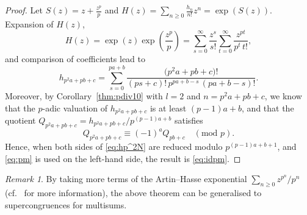 \documentclass[12pt,reqno]{amsart}
\numberwithin{equation}{section}
\theoremstyle{remark}
\newtheorem*{remark}{Remark}
\begin{document}
\begin{proof}
Let $S(z)=z+\frac {z^p}p$ and $H(z)=\sum_{n\ge0}\frac {h_n} {n!}z^n
=\exp(S(z))$. Expansion of $H(z)$, 
$$
H(z)=\exp(z)\exp\left(\frac {z^p} {p}\right)
=\sum_{s=0}^\infty \frac {z^s} {s!}
\sum_{t=0}^\infty \frac {z^{pt}} {p^t\,t!},
$$
and comparison of coefficients lead to
\begin{equation} \label{eq:hp^2N} 
h_{p^2a+pb+c}
=\sum_{s=0}^{pa+b} \frac {\big(p^2a+pb+c\big)!} 
{(ps+c)!\,p^{pa+b - s}\,\left(pa+b - s\right)!}.
\end{equation}
Moreover, by Corollary~\ref{thm:pdiv10} with $l=2$ and $n=p^2a+pb+c$,
we know that the $p$-adic valuation of 
$h_{p^2a+pb+c}$ is at least
$(p-1)a+b$, and that the quotient
$Q_{p^2a+pb+c}=h_{p^2a+pb+c}/p^{(p-1)a+b}$
satisfies
\begin{equation} \label{eq:pm}
Q_{p^2a+pb+c}\equiv (-1)^{a}Q_{pb+c} \quad (\text{mod }p).
\end{equation}
Hence, when both sides of \eqref{eq:hp^2N} are 
reduced modulo $p^{(p-1)a+b+1}$, and \eqref{eq:pm}
is used on the left-hand side, the result is \eqref{eq:idpm}.
\end{proof}

\begin{remark}
By taking more terms of the Artin--Hasse exponential 
$\sum_{n\ge0}z^{p^n}/p^n$ (cf.\ \cite[Sec.~7.2]{RobeAA} for more
information),
the above theorem can be generalised to supercongruences for
multisums.
\end{remark}
\end{document}
